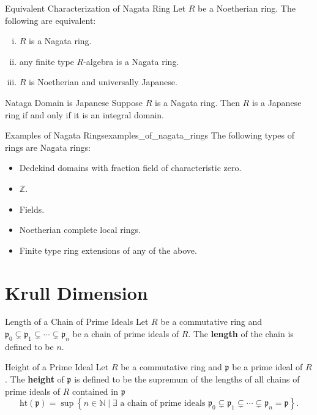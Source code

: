 \begin{proposition}{Equivalent Characterization of Nagata Ring}{}
    Let $R$ be a Noetherian ring. The following are equivalent:
    \begin{enumerate}[(i)]
        \item $R$ is a Nagata ring.
        \item any finite type $R$-algebra is a Nagata ring.
        \item $R$ is Noetherian and universally Japanese.
    \end{enumerate}
\end{proposition}
\begin{corollary}{Nataga Domain is Japanese}{}
    Suppose $R$ is a Nagata ring. Then $R$ is a Japanese ring if and only if it is an integral domain.
\end{corollary}

\begin{example}{Examples of Nagata Rings}{examples_of_nagata_rings}
    The following types of rings are Nagata rings:
    \begin{itemize}
        \item Dedekind domains with fraction field of characteristic zero.
        \item $\mathbb{Z}$.
        \item Fields.
        \item Noetherian complete local rings.
        \item Finite type ring extensions of any of the above.
    \end{itemize}
\end{example}


\section{Krull Dimension}
\begin{definition}{Length of a Chain of Prime Ideals}{}
    Let $R$ be a commutative ring and $\mathfrak{p}_0\subsetneq\mathfrak{p}_1\subsetneq\cdots\subsetneq\mathfrak{p}_n$ be a chain of prime ideals of $R$. The \textbf{length} of the chain is defined to be $n$.
\end{definition}


\begin{definition}{Height of a Prime Ideal}{}
    Let $R$ be a commutative ring and $\mathfrak{p}$ be a prime ideal of $R$. The \textbf{height} of $\mathfrak{p}$ is defined to be the supremum of the lengths of all chains of prime ideals of $R$ contained in $\mathfrak{p}$
    \[
    \mathrm{ht}(\mathfrak{p})=\sup\left\{n\in\mathbb{N}\mid\exists\text{ a chain of prime ideals }\mathfrak{p}_0\subsetneq\mathfrak{p}_1\subsetneq\cdots\subsetneq\mathfrak{p}_n=\mathfrak{p}\right\}.
    \]
\end{definition}


